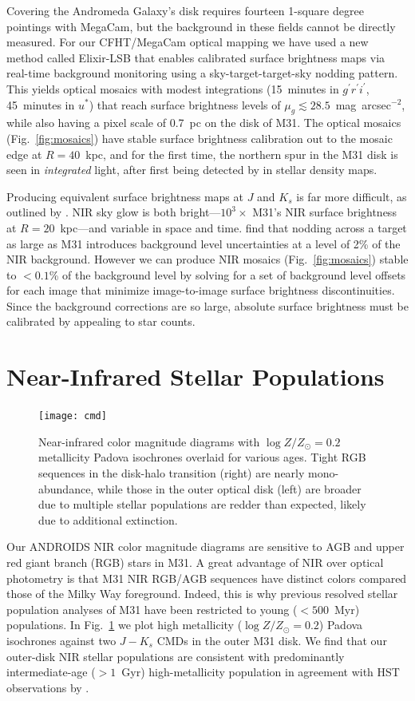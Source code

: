 \documentclass[11pt,twoside]{article}
\begin{document}
Covering the Andromeda Galaxy's disk requires fourteen 1-square degree pointings with MegaCam, but the background in these fields cannot be directly measured.
For our CFHT/MegaCam optical mapping we have used a new method called Elixir-LSB that enables calibrated surface brightness maps via real-time background monitoring  using a sky-target-target-sky nodding pattern.
This yields optical mosaics with modest integrations (15~minutes in $g^\prime r^\prime i^\prime$, 45~minutes in $u^*$) that reach surface brightness levels of $\mu_g \lesssim 28.5$~mag~arcsec$^{-2}$, while also having a pixel scale of 0.7~pc on the disk of M31.
The optical mosaics (Fig.~\ref{fig:mosaics}) have stable surface brightness calibration out to the mosaic edge at $R=40$~kpc, and for the first time, the northern spur in the M31 disk is seen in \emph{integrated} light, after first being detected by \cite{Ferguson:2002} in stellar density maps.

Producing equivalent surface brightness maps at $J$ and $K_s$ is far more difficult, as outlined by \cite{Sick:2013}.
NIR sky glow is both bright---$10^3\times$ M31's NIR surface brightness at $R=20$~kpc---and variable in space and time.
\citeauthor{Sick:2013} find that nodding across a target as large as M31 introduces background level uncertainties at a level of 2\% of the NIR background.
However we can produce NIR mosaics (Fig.~\ref{fig:mosaics}) stable to $<0.1$\% of the background level by solving for a set of background level offsets for each image that minimize image-to-image surface brightness discontinuities.
Since the background corrections are so large, absolute surface brightness must be calibrated by appealing to star counts.

\section{Near-Infrared Stellar Populations}

\begin{figure}[t]
\centering
\texttt{[image: cmd]}
\caption{Near-infrared color magnitude diagrams with $\log Z/Z_\odot=0.2$ metallicity Padova isochrones overlaid for various ages.
Tight RGB sequences in the disk-halo transition (right) are nearly mono-abundance, while those in the outer optical disk (left) are broader due to multiple stellar populations are redder than expected, likely due to additional extinction.}
\label{fig:cmd}
\end{figure}

Our ANDROIDS NIR color magnitude diagrams are sensitive to AGB and upper red giant branch (RGB) stars in M31.
A great advantage of NIR over optical photometry is that M31 NIR RGB/AGB sequences have distinct colors compared those of the Milky Way foreground.
Indeed, this is why previous resolved stellar population analyses of M31 \citep[e.g.,][]{Williams:2003} have been restricted to young ($<500$~Myr) populations.
In Fig.~\ref{fig:cmd} we plot high metallicity ($\log Z/Z_\odot = 0.2$) Padova isochrones \citep{Marigo:2008} against two $J-K_s$ CMDs in the outer M31 disk.
We find that our outer-disk NIR stellar populations are consistent with predominantly intermediate-age ($>1$~Gyr) high-metallicity population in agreement with HST observations by \cite{Brown:2006}.
\end{document}
